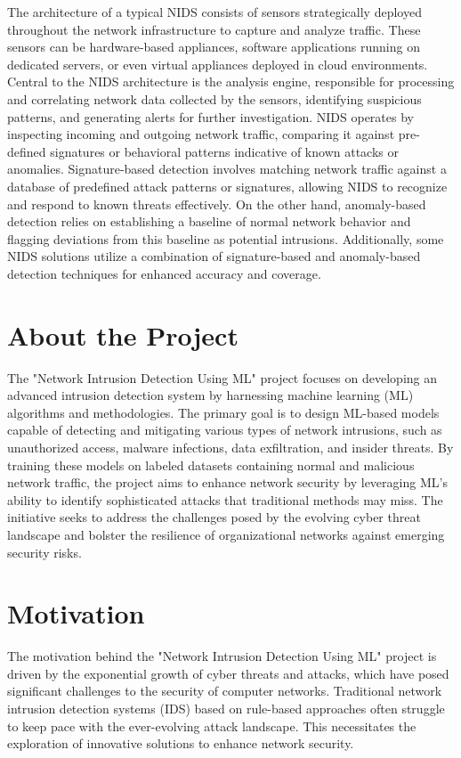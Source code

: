 The architecture of a typical NIDS consists of sensors strategically deployed throughout the
network infrastructure to capture and analyze traffic. These sensors can be hardware-based
appliances, software applications running on dedicated servers, or even virtual appliances
deployed in cloud environments. Central to the NIDS architecture is the analysis engine,
responsible for processing and correlating network data collected by the sensors, identifying
suspicious patterns, and generating alerts for further investigation. NIDS operates by
inspecting incoming and outgoing network traffic, comparing it against pre-defined signatures
or behavioral patterns indicative of known attacks or anomalies. Signature-based detection
involves matching network traffic against a database of predefined attack patterns or signatures,
allowing NIDS to recognize and respond to known threats effectively. On the other hand,
anomaly-based detection relies on establishing a baseline of normal network behavior and
flagging deviations from this baseline as potential intrusions. Additionally, some NIDS
solutions utilize a combination of signature-based and anomaly-based detection techniques for
enhanced accuracy and coverage.

\section{About the Project}
The "Network Intrusion Detection Using ML" project focuses on developing an advanced
intrusion detection system by harnessing machine learning (ML) algorithms and
methodologies. The primary goal is to design ML-based models capable of detecting and
mitigating various types of network intrusions, such as unauthorized access, malware
infections, data exfiltration, and insider threats. By training these models on labeled datasets
containing normal and malicious network traffic, the project aims to enhance network security
by leveraging ML's ability to identify sophisticated attacks that traditional methods may miss.
The initiative seeks to address the challenges posed by the evolving cyber threat landscape and
bolster the resilience of organizational networks against emerging security risks.

\section{Motivation}
The motivation behind the "Network Intrusion Detection Using ML" project is driven by the
exponential growth of cyber threats and attacks, which have posed significant challenges to the
security of computer networks. Traditional network intrusion detection systems (IDS) based on
rule-based approaches often struggle to keep pace with the ever-evolving attack landscape. This
necessitates the exploration of innovative solutions to enhance network security.

